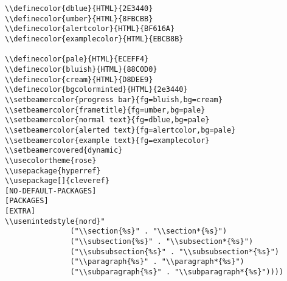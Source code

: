 \documentclass[c]{article}
\theoremstyle{plain}%
\theoremstyle{definition}
\theoremstyle{remark}
\begin{document}
\begin{verbatim}
\\definecolor{dblue}{HTML}{2E3440}
\\definecolor{umber}{HTML}{8FBCBB}
\\definecolor{alertcolor}{HTML}{BF616A}
\\definecolor{examplecolor}{HTML}{EBCB8B}

\\definecolor{pale}{HTML}{ECEFF4}
\\definecolor{bluish}{HTML}{88C0D0}
\\definecolor{cream}{HTML}{D8DEE9}
\\definecolor{bgcolorminted}{HTML}{2e3440}
\\setbeamercolor{progress bar}{fg=bluish,bg=cream}
\\setbeamercolor{frametitle}{fg=umber,bg=pale}
\\setbeamercolor{normal text}{fg=dblue,bg=pale}
\\setbeamercolor{alerted text}{fg=alertcolor,bg=pale}
\\setbeamercolor{example text}{fg=examplecolor}
\\setbeamercovered{dynamic}
\\usecolortheme{rose}
\\usepackage{hyperref}
\\usepackage[]{cleveref}
[NO-DEFAULT-PACKAGES]
[PACKAGES]
[EXTRA]
\\usemintedstyle{nord}"
               ("\\section{%s}" . "\\section*{%s}")
               ("\\subsection{%s}" . "\\subsection*{%s}")
               ("\\subsubsection{%s}" . "\\subsubsection*{%s}")
               ("\\paragraph{%s}" . "\\paragraph*{%s}")
               ("\\subparagraph{%s}" . "\\subparagraph*{%s}"))))
\end{verbatim}
\end{document}
